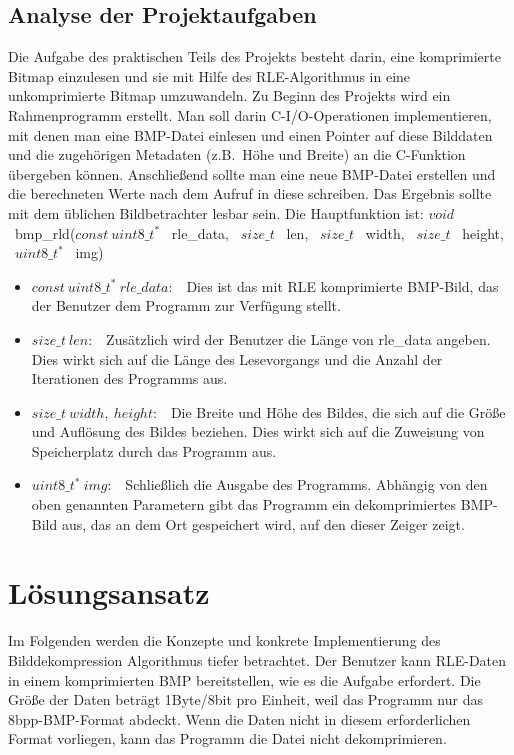 \documentclass[course=erap]{aspdoc}
\begin{document}
    \subsection{Analyse der Projektaufgaben}\label{subsec:analyse-der-projektaufgaben}
    Die Aufgabe des praktischen Teils des Projekts besteht darin, eine komprimierte Bitmap einzulesen und sie mit
    Hilfe des RLE-Algorithmus in eine unkomprimierte Bitmap umzuwandeln.
    \newline
    \newline
    Zu Beginn des Projekts wird ein Rahmenprogramm erstellt.
    Man soll darin C-I/O-Operationen implementieren, mit denen man eine BMP-Datei einlesen und einen Pointer auf diese
    Bilddaten und die zugehörigen Metadaten (z.B.\ Höhe und Breite) an die C-Funktion übergeben können.
    Anschließend sollte man eine neue BMP-Datei erstellen und die berechneten Werte nach dem Aufruf in diese schreiben.
    Das Ergebnis sollte mit dem üblichen Bildbetrachter lesbar sein.
    \newline
    \newline
    Die Hauptfunktion ist:
    \newline
    \newline
    $void$ \ bmp\_rld($const \ uint8\_t^*$ \ rle\_data, \ $size\_t$ \ len, \ $size\_t$ \ width, \ $size\_t$ \ height, \ $uint8\_t^*$ \ img)
    \begin{itemize}
        \item $const \ uint8\_t^* \ rle\_data:$ \ Dies ist das mit RLE komprimierte BMP-Bild, das der Benutzer dem
        Programm zur Verfügung stellt.
        \item $size\_t \ len:$ \ Zusätzlich wird der Benutzer die Länge von rle\_data angeben.
        Dies wirkt sich auf die Länge des Lesevorgangs und die Anzahl der Iterationen des Programms aus.
        \item $size\_t \ width,\ height:$ \ Die Breite und Höhe des Bildes, die sich auf die Größe und Auflösung des
        Bildes beziehen.
        Dies wirkt sich auf die Zuweisung von Speicherplatz durch das Programm aus.
        \item $uint8\_t^* \ img:$ \ Schließlich die Ausgabe des Programms.
        Abhängig von den oben genannten Parametern gibt das Programm ein dekomprimiertes BMP-Bild aus, das an dem Ort
        gespeichert wird, auf den dieser Zeiger zeigt.
        \noindent
    \end{itemize}


    \section{Lösungsansatz}\label{sec:losungsansatz}
    Im Folgenden werden die Konzepte und konkrete Implementierung des Bilddekompression Algorithmus tiefer betrachtet.
    \newline
    \newline
    Der Benutzer kann RLE-Daten in einem komprimierten BMP bereitstellen, wie es die Aufgabe erfordert.
    Die Größe der Daten beträgt 1Byte/8bit pro Einheit, weil das Programm nur das 8bpp-BMP-Format abdeckt.
    Wenn die Daten nicht in diesem erforderlichen Format vorliegen, kann das Programm die Datei nicht dekomprimieren.
\end{document}

